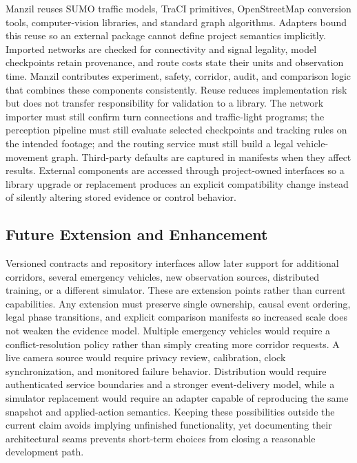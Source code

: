 Manzil reuses SUMO traffic models, TraCI primitives, OpenStreetMap conversion tools, computer-vision libraries, and standard graph algorithms. Adapters bound this reuse so an external package cannot define project semantics implicitly. Imported networks are checked for connectivity and signal legality, model checkpoints retain provenance, and route costs state their units and observation time. Manzil contributes experiment, safety, corridor, audit, and comparison logic that combines these components consistently. Reuse reduces implementation risk but does not transfer responsibility for validation to a library. The network importer must still confirm turn connections and traffic-light programs; the perception pipeline must still evaluate selected checkpoints and tracking rules on the intended footage; and the routing service must still build a legal vehicle-movement graph. Third-party defaults are captured in manifests when they affect results. External components are accessed through project-owned interfaces so a library upgrade or replacement produces an explicit compatibility change instead of silently altering stored evidence or control behavior.

\subsection{Future Extension and Enhancement}

Versioned contracts and repository interfaces allow later support for additional corridors, several emergency vehicles, new observation sources, distributed training, or a different simulator. These are extension points rather than current capabilities. Any extension must preserve single ownership, causal event ordering, legal phase transitions, and explicit comparison manifests so increased scale does not weaken the evidence model. Multiple emergency vehicles would require a conflict-resolution policy rather than simply creating more corridor requests. A live camera source would require privacy review, calibration, clock synchronization, and monitored failure behavior. Distribution would require authenticated service boundaries and a stronger event-delivery model, while a simulator replacement would require an adapter capable of reproducing the same snapshot and applied-action semantics. Keeping these possibilities outside the current claim avoids implying unfinished functionality, yet documenting their architectural seams prevents short-term choices from closing a reasonable development path.

